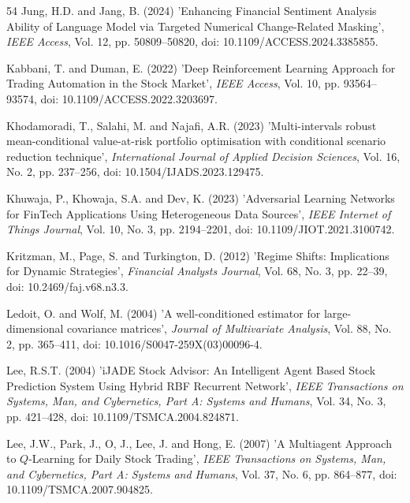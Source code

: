 \begin{thebibliography}{54}
Jung, H.D. and Jang, B. (2024) 'Enhancing Financial Sentiment Analysis Ability of Language Model via Targeted Numerical Change-Related Masking', {\it IEEE Access}, Vol. 12, pp. 50809--50820, doi: 10.1109/ACCESS.2024.3385855.

Kabbani, T. and Duman, E. (2022) 'Deep Reinforcement Learning Approach for Trading Automation in the Stock Market', {\it IEEE Access}, Vol. 10, pp. 93564--93574, doi: 10.1109/ACCESS.2022.3203697.

Khodamoradi, T., Salahi, M. and Najafi, A.R. (2023) 'Multi-intervals robust mean-conditional value-at-risk portfolio optimisation with conditional scenario reduction technique', {\it International Journal of Applied Decision Sciences}, Vol. 16, No. 2, pp. 237--256, doi: 10.1504/IJADS.2023.129475.

Khuwaja, P., Khowaja, S.A. and Dev, K. (2023) 'Adversarial Learning Networks for FinTech Applications Using Heterogeneous Data Sources', {\it IEEE Internet of Things Journal}, Vol. 10, No. 3, pp. 2194--2201, doi: 10.1109/JIOT.2021.3100742.

Kritzman, M., Page, S. and Turkington, D. (2012) 'Regime Shifts: Implications for Dynamic Strategies', {\it Financial Analysts Journal}, Vol. 68, No. 3, pp. 22--39, doi: 10.2469/faj.v68.n3.3.

Ledoit, O. and Wolf, M. (2004) 'A well-conditioned estimator for large-dimensional covariance matrices', {\it Journal of Multivariate Analysis}, Vol. 88, No. 2, pp. 365--411, doi: 10.1016/S0047-259X(03)00096-4.

Lee, R.S.T. (2004) 'iJADE Stock Advisor: An Intelligent Agent Based Stock Prediction System Using Hybrid RBF Recurrent Network', {\it IEEE Transactions on Systems, Man, and Cybernetics, Part A: Systems and Humans}, Vol. 34, No. 3, pp. 421--428, doi: 10.1109/TSMCA.2004.824871.

Lee, J.W., Park, J., O, J., Lee, J. and Hong, E. (2007) 'A Multiagent Approach to $Q$-Learning for Daily Stock Trading', {\it IEEE Transactions on Systems, Man, and Cybernetics, Part A: Systems and Humans}, Vol. 37, No. 6, pp. 864--877, doi: 10.1109/TSMCA.2007.904825.


\end{thebibliography}
